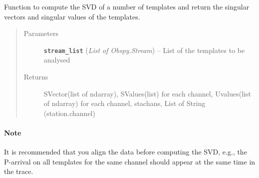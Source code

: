\documentclass[a4paper,10pt,english]{sphinxmanual}
\begin{document}
\begin{fulllineitems}
\label{submodules/utils.clustering:clustering.SVD}
Function to compute the SVD of a number of templates and return the singular
vectors and singular values of the templates.
\begin{quote}\begin{description}
\item[{Parameters}] \leavevmode
\textbf{\texttt{stream\_list}} (\emph{List of Obspy.Stream}) -- List of the templates to be analysed

\item[{Returns}] \leavevmode
SVector(list of ndarray), SValues(list) for each channel,             Uvalues(list of ndarray) for each channel,             stachans, List of String (station.channel)

\end{description}\end{quote}
\paragraph{Note}

It is recommended that you align the data before computing the SVD, e.g.,
the P-arrival on all templates for the same channel should appear at the same
time in the trace.

\end{fulllineitems}

\end{document}
